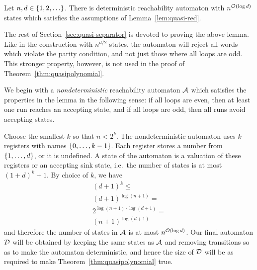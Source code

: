 \begin{lemma}\label{lem:quasi-reduction} 
Let $n,d \in \{1,2,\ldots\}$. There is deterministic reachability automaton with $n^{\mathcal{O}(\log d)}$ states which satisfies the assumptions of  Lemma~\ref{lem:quasi-red}.
\end{lemma}



The rest of Section~\ref{sec:quasi-separator} is devoted to proving the above lemma. Like in the construction with $n^{d/2}$ states,  the automaton will reject all words which violate the parity condition, and not just those where all loops are odd.   This stronger property, however, is not used  in the proof of Theorem~\ref{thm:quasipolynomial}.




We begin with a \emph{nondeterministic} reachability automaton $\mathcal{A}$ which satisfies the properties in the lemma in the following sense: if all loops are even, then at least one run reaches an accepting state, and if all loops are odd, then all runs avoid accepting states.


Choose the smallest $k$ so that $n < 2^k$. 
The nondeterministic automaton   uses  $k$ registers with names $\{0,\ldots,k -1\}$. Each register stores a number  from $\{1,\ldots,d\}$, or it is undefined. A state of the automaton is a valuation of these registers or an accepting sink state, i.e.~the number of states is at most $(1+d)^k + 1$. By choice of $k$, we have
\begin{align*}
(d+1)^k \le \\
  (d+1)^{\log(n+1)}  = \\
  2^{\log(n+1) \cdot \log(d+1)} = \\
  (n+1)^{\log(d+1)} 
\end{align*}
and therefore the number of states in $\mathcal{A}$ is at most $n^{\mathcal{O}(\log d)}$. Our final automaton $\mathcal{D}$ will be obtained by keeping the same states as $\mathcal{A}$ and removing transitions so as to make the automaton deterministic, and hence the size of $\mathcal{D}$ will be as required to make Theorem~\ref{thm:quasipolynomial} true.




